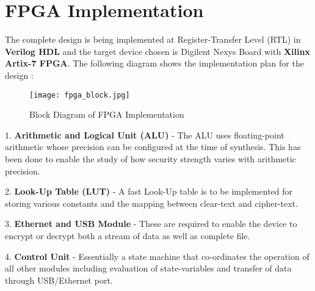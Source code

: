 \section{FPGA Implementation}
The complete design is being implemented at Register-Transfer Level (RTL) in {\bf Verilog HDL} and the target device chosen is Digilent Nexys Board with {\bf Xilinx Artix-7 FPGA}. The following diagram shows the implementation plan for the design :
\begin{figure}[H]
\centering
\texttt{[image: fpga\_block.jpg]}
\caption{Block Diagram of FPGA Implementation}\label{fig:fpga_block}
\end{figure}

1. {\bf Arithmetic and Logical Unit (ALU)} - The ALU uses floating-point arithmetic whose precision can be configured at the time of synthesis. This has been done to enable the study of how security strength varies with arithmetic precision.

2. {\bf Look-Up Table (LUT)} - A fast Look-Up table is to be implemented for storing various constants and the mapping between clear-text and cipher-text.

3. {\bf Ethernet and USB Module} - These are required to enable the device to encrypt or decrypt both a stream of data as well as complete file.

4. {\bf Control Unit} - Essentially a state machine that co-ordinates the operation of all other modules including evaluation of state-variables and transfer of data through USB/Ethernet port.
